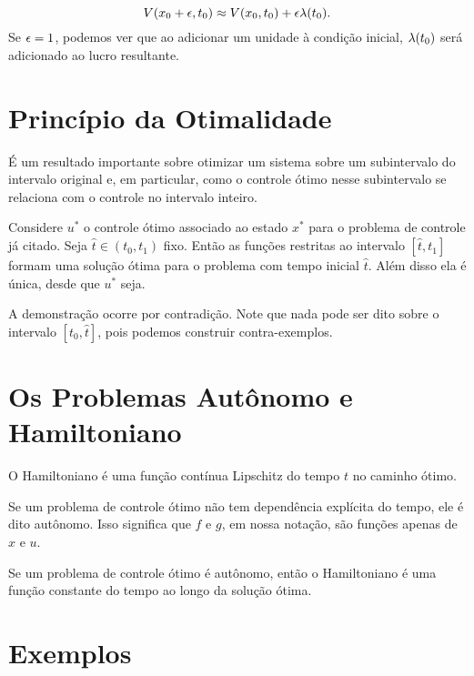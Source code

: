\begin{equation*}
    V(x_0 + \epsilon,t_0) \approx V(x_0,t_0) + \epsilon\lambda(t_0). 
\end{equation*}
Se $\epsilon = 1$, podemos ver que ao adicionar um unidade à condição inicial,
$\lambda(t_0)$ será adicionado ao lucro resultante. 

\section{Princípio da Otimalidade}

É um resultado importante sobre otimizar um sistema sobre um subintervalo do
intervalo original e, em particular, como o controle ótimo nesse subintervalo
se relaciona com o controle no intervalo inteiro. 

\begin{theorem}
    Considere $u^*$ o controle ótimo associado ao estado $x^*$ para o problema
    de controle já citado. Seja $\hat{t} \in (t_0, t_1)$ fixo. Então as
    funções restritas ao intervalo $[\hat{t},t_1]$ formam uma solução ótima para o problema com
    tempo inicial $\hat{t}$. Além disso ela é única, desde que $u^*$ seja. 
\end{theorem}

A demonstração ocorre por contradição. Note que nada pode ser dito sobre o
intervalo $[t_0, \hat{t}]$, pois podemos construir contra-exemplos. 

\section{Os Problemas Autônomo e Hamiltoniano}

\begin{theorem}
    O Hamiltoniano é uma função contínua Lipschitz do tempo $t$ no caminho
    ótimo. 
\end{theorem}

\begin{definition}[Autônomo]
    Se um problema de controle ótimo não tem dependência explícita do tempo,
    ele é dito autônomo. Isso significa que $f$ e $g$, em nossa notação, são
    funções apenas de $x$ e $u$. 
\end{definition}

\begin{theorem}
    Se um problema de controle ótimo é autônomo, então o Hamiltoniano é uma
    função constante do tempo ao longo da solução ótima. 
\end{theorem}

\section{Exemplos}